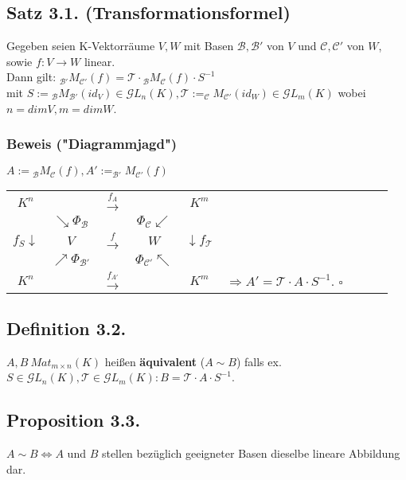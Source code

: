 \documentclass[a4paper,twoside]{article}
\begin{document}
\subsection*{Satz 3.1. (Transformationsformel)}
Gegeben seien K-Vektorräume $V, W$ mit Basen $\mathcal{B}, \mathcal{B'}$ von $V$ und $\mathcal{C}, \mathcal{C'}$ von $W$, sowie $f: V \longrightarrow W$ linear.\\ Dann gilt: $_\mathcal{B'}M_\mathcal{C'}(f) = \mathcal{T} \cdot {_\mathcal B}M_\mathcal{C}(f) \cdot S^{-1}$\\ mit $S := {_\mathcal B}M_\mathcal{B'}(id_V) \in \mathcal{G}L_n(K), \mathcal{T} := _\mathcal{C}M_\mathcal{C'}(id_W) \in \mathcal{G}L_m(K)$ wobei $n = dim V, m = dim W$.\\
\subsubsection*{Beweis ("Diagrammjagd")}
$A := {_\mathcal B}M_\mathcal{C}(f), A' := _\mathcal{B'}M_\mathcal{C'}(f)$\\
\begin{tabular}[h]{ccccccccc}
	 $K^n$ & & $\xrightarrow{f_A}$ & & $K^m$\\
	 & $\searrow \Phi{_\mathcal B}$ & & $\Phi_\mathcal{C} \swarrow$ & \\
	 $f_S \downarrow$ & $V$ & $\xrightarrow{f}$ & $W$ & $\downarrow f_\mathcal{T}$ \\
	 & $\nearrow \Phi_\mathcal{B'}$ & & $\Phi_\mathcal{C'} \nwarrow$ & \\
	 $K^n$ & & $\xrightarrow{f_{A'}}$ & & $K^m$ & $\Rightarrow A' = \mathcal{T} \cdot A \cdot S^{-1}$. $\square$\\
\end{tabular}

\subsection*{Definition 3.2.}
$A, B \ Mat_{m\times n}(K)$ heißen \textbf{äquivalent} ($A\sim B$) falls ex. $S \in \mathcal{G}L_n(K), \mathcal{T} \in \mathcal{G}L_m(K): B = \mathcal{T} \cdot A \cdot S^{-1}$.

\subsection*{Proposition 3.3.}
$A \sim B \Leftrightarrow A$ und $B$ stellen bezüglich geeigneter Basen dieselbe lineare Abbildung dar.
\end{document}
